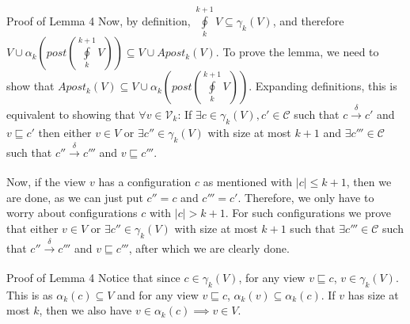 \documentclass{beamer}
\begin{document}
{        \begin{frame}{Proof of Lemma 4}
            Now, by definition, $\oint\limits_{k}^{k + 1} V \subseteq \gamma_{k}(V)$, and therefore $V \cup \alpha_{k}(post(\oint\limits_{k}^{k + 1} V)) \subseteq V \cup Apost_{k}(V)$. %
            To prove the lemma, we need to show that $Apost_{k}(V) \subseteq V \cup \alpha_{k}(post(\oint\limits_{k}^{k + 1} V))$. Expanding definitions, this is equivalent to showing that $\forall v \in \mathcal{V}_{k}$: If $\exists c \in \gamma_{k}(V), c' \in \mathcal{C}$ such that $c \xrightarrow[]{\delta} c'$ and $v \sqsubseteq c'$ then either $v \in V$ or $\exists c'' \in \gamma_{k}(V)$ with size at most $k + 1$ and $\exists c''' \in \mathcal{C}$ such that $c'' \xrightarrow[]{\delta} c'''$ and $v \sqsubseteq c'''$.

            Now, if the view $v$ has a configuration $c$ as mentioned with $\left|c\right| \leq k + 1$, then we are done, as we can just put $c'' = c$ and $c''' = c'$. Therefore, we only have to worry about configurations $c$ with $\left|c\right| > k + 1$. %
            For such configurations we prove that either $v \in V$ or $\exists c'' \in \gamma_{k}(V)$ with size at most $k + 1$ such that $\exists c''' \in \mathcal{C}$ such that $c'' \xrightarrow[]{\delta} c'''$ and $v \sqsubseteq c'''$, after which we are clearly done.
        \end{frame}

        \begin{frame}{Proof of Lemma 4}
            Notice that since $c \in \gamma_{k}(V)$, for any view $v \sqsubseteq c$, $v \in \gamma_{k}(V)$. This is as $\alpha_{k}(c) \subseteq V$ and for any view $v \sqsubseteq c$, $\alpha_{k}(v) \subseteq \alpha_{k}(c)$. If $v$ has size at most $k$, then we also have $v \in \alpha_{k}(c) \implies v \in V$.


\end{frame}}
\end{document}
